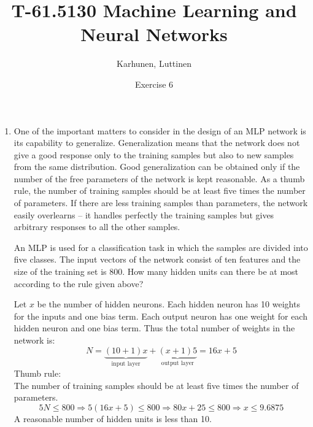 \title{T-61.5130 Machine Learning and Neural Networks}
\author{Karhunen, Luttinen}
\date{Exercise 6}

\newcommand{\vect}[1]{{\bf{#1}}}
\newcommand{\svect}[1]{\boldsymbol{#1}}
\newcommand{\matr}[1]{\boldsymbol{#1}}
\newcommand{\T}{\mathcal{T}}
\newcommand{\x}{{\bf x}}





\maketitle
\thispagestyle{empty}

\begin{enumerate}

\item One of the important matters to consider in the design of an MLP
  network is its capability to generalize. Generalization means that
  the network does not give a good response only to the training
  samples but also to new samples from the same distribution. Good
  generalization can be obtained only if the number of the free
  parameters of the network is kept reasonable. As a thumb rule, the
  number of training samples should be at least five times the number
  of parameters. If there are less training samples than parameters,
  the network easily overlearns -- it handles perfectly the training
  samples but gives arbitrary responses to all the other samples.

  An MLP is used for a classification task in which the samples are
  divided into five classes. The input vectors of the network consist
  of ten features and the size of the training set is 800. How many
  hidden units can there be at most according to the rule given above?

  \begin{solution}

    Let $x$ be the number of hidden neurons. Each hidden neuron has
    10 weights for the inputs and one bias term. Each output neuron has one
    weight for each hidden neuron and one bias term. Thus the total number
    of weights in the network is:
    \begin{equation*}
      N=\underbrace{(10+1)x}_{\text{input
          layer}}+\underbrace{(x+1)5}_{\text{output layer}}=16x+5
    \end{equation*}
    Thumb rule:\\
    The number of  training samples should be at least five times the
    number of parameters.
    \begin{equation*}
      5N\leq800 \Rightarrow 5(16x+5)\leq 800\Rightarrow 80x+25\leq
      800\Rightarrow x\leq9.6875
    \end{equation*}
    A reasonable number of hidden units is less than 10.
  \end{solution}
  


\end{enumerate}
